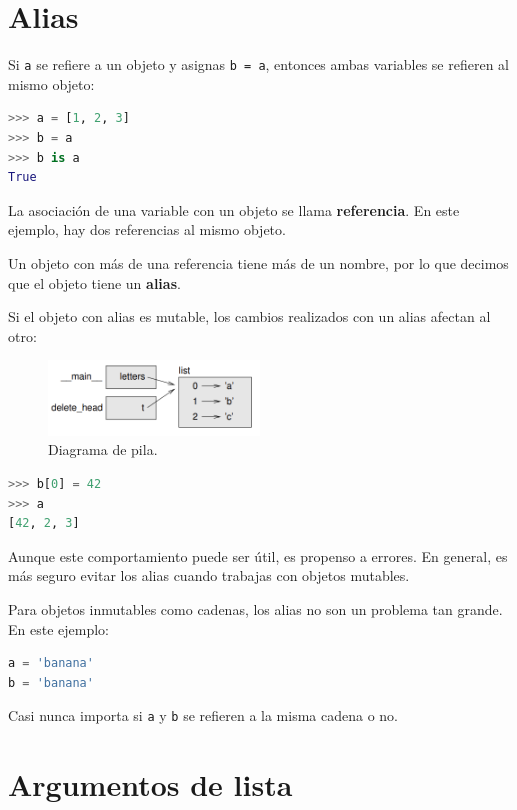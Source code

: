 \section{Alias}

Si \texttt{a} se refiere a un objeto y asignas \texttt{b = a}, entonces ambas variables se refieren al mismo objeto:

\begin{lstlisting}[language=Python]
>>> a = [1, 2, 3] 
>>> b = a 
>>> b is a 
True
\end{lstlisting}

La asociación de una variable con un objeto se llama \textbf{referencia}. En este ejemplo, hay dos referencias al mismo objeto.

Un objeto con más de una referencia tiene más de un nombre, por lo que decimos que el objeto tiene un \textbf{alias}.

Si el objeto con alias es mutable, los cambios realizados con un alias afectan al otro:

\begin{figure}[h]
        \centering
        \includegraphics[width=0.5\textwidth]{./images/chapter_10_5.png}
        \caption{Diagrama de pila.}
        \label{fig:10_5}
        \end{figure}


\begin{lstlisting}[language=Python]
>>> b[0] = 42 
>>> a 
[42, 2, 3]
\end{lstlisting}

Aunque este comportamiento puede ser útil, es propenso a errores. En general, es más seguro evitar los alias cuando trabajas con objetos mutables.

Para objetos inmutables como cadenas, los alias no son un problema tan grande. En este ejemplo:

\begin{lstlisting}[language=Python]
a = 'banana'
b = 'banana'
\end{lstlisting}

Casi nunca importa si \texttt{a} y \texttt{b} se refieren a la misma cadena o no.

\section{Argumentos de lista}

